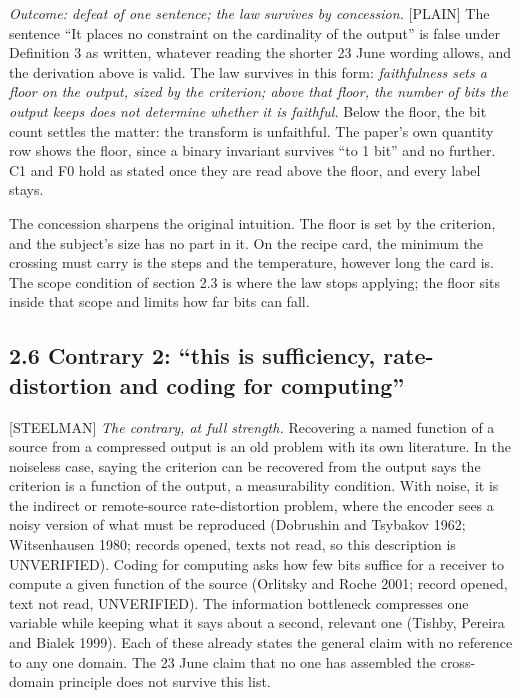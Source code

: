 \documentclass[11pt]{article}
\newcommand{\register}[1]{{\ttfamily\small #1}}
\begin{document}
\emph{Outcome: defeat of one sentence; the law survives by concession.} \register{[PLAIN]} The sentence ``It places no constraint on the cardinality of the output'' is false under Definition 3 as written, whatever reading the shorter 23 June wording allows, and the derivation above is valid. The law survives in this form: \emph{faithfulness sets a floor on the output, sized by the criterion; above that floor, the number of bits the output keeps does not determine whether it is faithful.} Below the floor, the bit count settles the matter: the transform is unfaithful. The paper's own quantity row shows the floor, since a binary invariant survives ``to 1 bit'' and no further. C1 and F0 hold as stated once they are read above the floor, and every label stays.

The concession sharpens the original intuition. The floor is set by the criterion, and the subject's size has no part in it. On the recipe card, the minimum the crossing must carry is the steps and the temperature, however long the card is. The scope condition of section 2.3 is where the law stops applying; the floor sits inside that scope and limits how far bits can fall.

\subsection*{2.6 Contrary 2: ``this is sufficiency, rate-distortion and coding for computing''}

\register{[STEELMAN]} \emph{The contrary, at full strength.} Recovering a named function of a source from a compressed output is an old problem with its own literature. In the noiseless case, saying the criterion can be recovered from the output says the criterion is a function of the output, a measurability condition. With noise, it is the indirect or remote-source rate-distortion problem, where the encoder sees a noisy version of what must be reproduced (Dobrushin and Tsybakov 1962; Witsenhausen 1980; records opened, texts not read, so this description is UNVERIFIED). Coding for computing asks how few bits suffice for a receiver to compute a given function of the source (Orlitsky and Roche 2001; record opened, text not read, UNVERIFIED). The information bottleneck compresses one variable while keeping what it says about a second, relevant one (Tishby, Pereira and Bialek 1999). Each of these already states the general claim with no reference to any one domain. The 23 June claim that no one has assembled the cross-domain principle does not survive this list.
\end{document}
